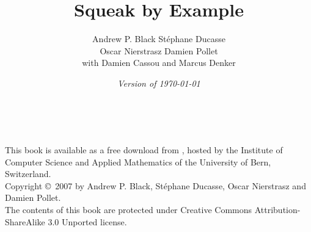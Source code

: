 \documentclass[a4paper,10pt,twoside]{book}
\begin{document}
\frontmatter
\setcounter{page}{1}
\pagestyle{headings}
\author{
	Andrew P. Black\quad
	St\'ephane Ducasse\\[1ex]
	Oscar Nierstrasz\quad
	Damien Pollet
	\\[4ex]
	with Damien Cassou and Marcus Denker}
\title{\Huge\bf Squeak by Example}
\isodate
\date{\emph{Version of \today}}
\maketitle
~ %
\vfill
\begin{footnotesize}
\setlength{\parindent}{0pt}
This book is available as a free download from \sbe, hosted by the
Institute of Computer Science and Applied Mathematics of the
University of Bern, Switzerland.\\[1cm]

Copyright \copyright~2007 by Andrew P. Black, St\'ephane Ducasse, Oscar Nierstrasz and Damien Pollet.\\[1cm]

The contents of this book are protected under Creative Commons Attribution-ShareAlike 3.0 Unported license.


\end{footnotesize}
\end{document}
